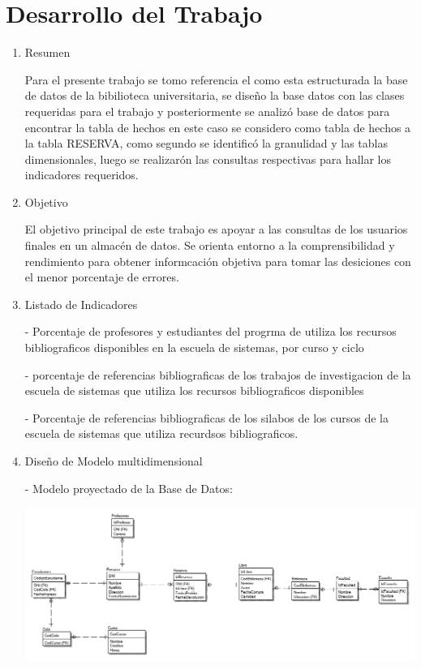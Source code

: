 
\section{Desarrollo del Trabajo} 

\begin{enumerate}[1.]
         

	\item Resumen

  Para el presente trabajo se tomo referencia el como esta estructurada la base de datos de la bibilioteca universitaria, se diseño la base datos con las clases requeridas para el trabajo y posteriormente se analiz\'o base de datos para encontrar la tabla de hechos en este caso se considero como tabla de hechos a la tabla RESERVA, como segundo se identific\'o la granulidad y las tablas dimensionales, luego se realizar\'on las consultas respectivas para hallar los indicadores requeridos.
\\
	\item Objetivo

 El objetivo principal de este trabajo es apoyar a las consultas de los usuarios finales en un almacén de datos. Se orienta entorno a la comprensibilidad y rendimiento para obtener informcaci\'on objetiva para tomar las desiciones con el menor porcentaje de errores.
\\	
	\item Listado de Indicadores
	
-  Porcentaje de profesores y estudiantes del progrma de utiliza los recursos bibliograficos disponibles en la escuela de sistemas, por curso y ciclo

-  porcentaje de referencias  bibliograficas de los trabajos de investigacion de la escuela de sistemas que utiliza los recursos bibliograficos disponibles

- Porcentaje de referencias  bibliograficas  de los silabos de los cursos de la escuela  de sistemas que utiliza recurdsos bibliograficos.
\\	
	
	\item Diseño de Modelo multidimensional
	
- Modelo proyectado de la Base de Datos:
	\begin{center}
	\includegraphics[width=17cm]{./Imagenes/BD_biblioteca} 
	\end{center}


\end{enumerate}
